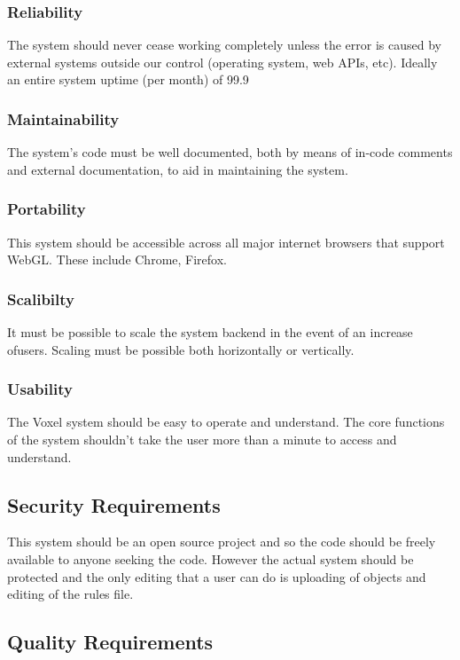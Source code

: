 \documentclass[english]{article}
\begin{document}
		\subsubsection{Reliability}
		The system should never cease working completely unless the error is caused
		by external systems outside our control (operating system, web APIs, etc).
		Ideally an entire system uptime (per month) of 99.9%
		
		\subsubsection{Maintainability}
		The system’s code must be well documented, both by means of in-code comments and external documentation, to aid in 
		maintaining the system.
		
		\subsubsection{Portability}
		This system should be accessible across all major internet browsers that support WebGL. These include Chrome, Firefox.
		
		\subsubsection{Scalibilty}
		It must be possible to scale the system backend in the event of an increase ofusers. Scaling must be possible both 
		horizontally or vertically.
		
		\subsubsection{Usability}
		The Voxel system should be easy to operate and understand. The core functions of the system shouldn't take the user more 
		than a minute to access and understand.
		
		\subsection{Security Requirements}
		This system should be an open source project and so the code should be freely available to anyone seeking the code.
		However the actual system should be protected and the only editing that a user can do is uploading of objects and 
		editing of the rules file.
		
		\subsection{Quality Requirements}
		
		
	\pagebreak
	
\end{document}
